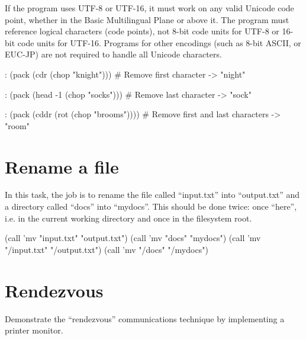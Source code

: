 If the program uses UTF-8 or UTF-16, it must work on any valid Unicode
code point, whether in the Basic Multilingual Plane or above it. The
program must reference logical characters (code points), not 8-bit code
units for UTF-8 or 16-bit code units for UTF-16. Programs for other
encodings (such as 8-bit ASCII, or EUC-JP) are not required to handle
all Unicode characters.

\begin{wideverbatim}

: (pack (cdr (chop "knight")))         # Remove first character
-> "night"

: (pack (head -1 (chop "socks")))      # Remove last character
-> "sock"

: (pack (cddr (rot (chop "brooms"))))  # Remove first and last characters
-> "room"

\end{wideverbatim}

\pagebreak{}
\section*{Rename a file}

In this task, the job is to rename the file called ``input.txt'' into
``output.txt'' and a directory called ``docs'' into ``mydocs''. This
should be done twice: once ``here'', i.e. in the current working
directory and once in the filesystem root.


\begin{wideverbatim}

(call 'mv "input.txt" "output.txt")
(call 'mv "docs" "mydocs")
(call 'mv "/input.txt" "/output.txt")
(call 'mv "/docs" "/mydocs")

\end{wideverbatim}

\pagebreak{}
\section*{Rendezvous}

Demonstrate the ``rendezvous'' communications technique by implementing
a printer monitor.

